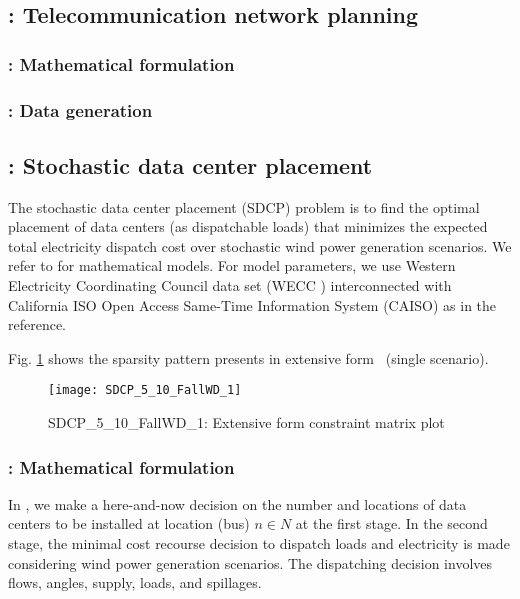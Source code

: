 \subsection{\phone: Telecommunication network planning} \label{PHONE}

\subsubsection{\phone: Mathematical formulation}

\subsubsection{\phone: Data generation}


\subsection{\sdcp: Stochastic data center placement} \label{SDCP}
The stochastic data center placement (SDCP) problem is to find the optimal placement of data centers (as dispatchable loads) that minimizes the expected total electricity dispatch cost over stochastic wind power generation scenarios. We refer to \cite{journal:KYZC2017} for mathematical models. For model parameters, we use Western Electricity Coordinating Council data set (WECC \cite{web:wecc}) interconnected with California ISO Open Access Same-Time Information System (CAISO) as in the reference. 

Fig. \ref{fig:sdcp_sparsity} shows the sparsity pattern presents in extensive form \sdcp\ (single scenario).
\begin{figure}[H]
	\centering
	\texttt{[image: SDCP\_5\_10\_FallWD\_1]}
	\caption{SDCP\_5\_10\_FallWD\_1: Extensive form constraint matrix plot}
	\label{fig:sdcp_sparsity}
\end{figure}

\subsubsection{\sdcp: Mathematical formulation}
In \sdcp, we make a here-and-now decision on the number and locations of data centers to be installed at location (bus) $n\in N$ at the first stage. In the second stage, the minimal cost recourse decision to dispatch loads and electricity is made considering wind power generation scenarios. The dispatching decision involves flows, angles, supply, loads, and spillages.

